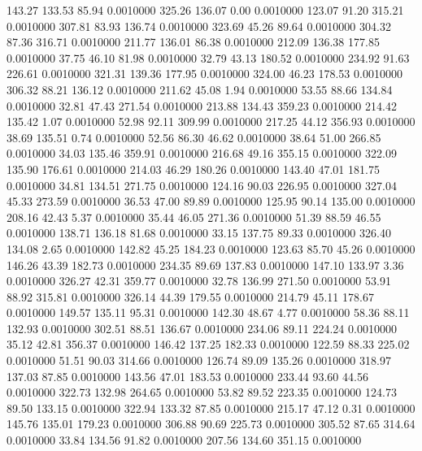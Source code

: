  143.27  133.53   85.94   0.0010000
 325.26  136.07    0.00   0.0010000
 123.07   91.20  315.21   0.0010000
 307.81   83.93  136.74   0.0010000
 323.69   45.26   89.64   0.0010000
 304.32   87.36  316.71   0.0010000
 211.77  136.01   86.38   0.0010000
 212.09  136.38  177.85   0.0010000
  37.75   46.10   81.98   0.0010000
  32.79   43.13  180.52   0.0010000
 234.92   91.63  226.61   0.0010000
 321.31  139.36  177.95   0.0010000
 324.00   46.23  178.53   0.0010000
 306.32   88.21  136.12   0.0010000
 211.62   45.08    1.94   0.0010000
  53.55   88.66  134.84   0.0010000
  32.81   47.43  271.54   0.0010000
 213.88  134.43  359.23   0.0010000
 214.42  135.42    1.07   0.0010000
  52.98   92.11  309.99   0.0010000
 217.25   44.12  356.93   0.0010000
  38.69  135.51    0.74   0.0010000
  52.56   86.30   46.62   0.0010000
  38.64   51.00  266.85   0.0010000
  34.03  135.46  359.91   0.0010000
 216.68   49.16  355.15   0.0010000
 322.09  135.90  176.61   0.0010000
 214.03   46.29  180.26   0.0010000
 143.40   47.01  181.75   0.0010000
  34.81  134.51  271.75   0.0010000
 124.16   90.03  226.95   0.0010000
 327.04   45.33  273.59   0.0010000
  36.53   47.00   89.89   0.0010000
 125.95   90.14  135.00   0.0010000
 208.16   42.43    5.37   0.0010000
  35.44   46.05  271.36   0.0010000
  51.39   88.59   46.55   0.0010000
 138.71  136.18   81.68   0.0010000
  33.15  137.75   89.33   0.0010000
 326.40  134.08    2.65   0.0010000
 142.82   45.25  184.23   0.0010000
 123.63   85.70   45.26   0.0010000
 146.26   43.39  182.73   0.0010000
 234.35   89.69  137.83   0.0010000
 147.10  133.97    3.36   0.0010000
 326.27   42.31  359.77   0.0010000
  32.78  136.99  271.50   0.0010000
  53.91   88.92  315.81   0.0010000
 326.14   44.39  179.55   0.0010000
 214.79   45.11  178.67   0.0010000
 149.57  135.11   95.31   0.0010000
 142.30   48.67    4.77   0.0010000
  58.36   88.11  132.93   0.0010000
 302.51   88.51  136.67   0.0010000
 234.06   89.11  224.24   0.0010000
  35.12   42.81  356.37   0.0010000
 146.42  137.25  182.33   0.0010000
 122.59   88.33  225.02   0.0010000
  51.51   90.03  314.66   0.0010000
 126.74   89.09  135.26   0.0010000
 318.97  137.03   87.85   0.0010000
 143.56   47.01  183.53   0.0010000
 233.44   93.60   44.56   0.0010000
 322.73  132.98  264.65   0.0010000
  53.82   89.52  223.35   0.0010000
 124.73   89.50  133.15   0.0010000
 322.94  133.32   87.85   0.0010000
 215.17   47.12    0.31   0.0010000
 145.76  135.01  179.23   0.0010000
 306.88   90.69  225.73   0.0010000
 305.52   87.65  314.64   0.0010000
  33.84  134.56   91.82   0.0010000
 207.56  134.60  351.15   0.0010000
